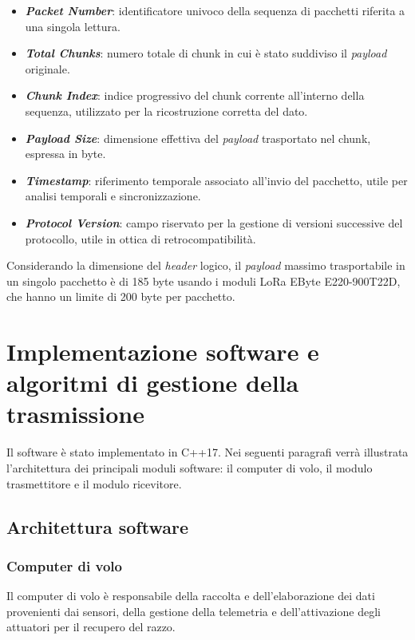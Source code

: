 \documentclass[12pt,a4paper,twoside]{book}
\begin{document}
\begin{itemize}
    \item \textbf{\emph{Packet Number}}: identificatore univoco della sequenza di pacchetti riferita a una singola lettura.
    \item \textbf{\emph{Total Chunks}}: numero totale di chunk in cui è stato suddiviso il \emph{payload} originale.
    \item \textbf{\emph{Chunk Index}}: indice progressivo del chunk corrente all'interno della sequenza, utilizzato per la ricostruzione corretta del dato.
    \item \textbf{\emph{Payload Size}}: dimensione effettiva del \emph{payload} trasportato nel chunk, espressa in byte.
    \item \textbf{\emph{Timestamp}}: riferimento temporale associato all’invio del pacchetto, utile per analisi temporali e sincronizzazione.
    \item \textbf{\emph{Protocol Version}}: campo riservato per la gestione di versioni successive del protocollo, utile in ottica di retrocompatibilità.
\end{itemize}

Considerando la dimensione del \emph{header} logico, il \emph{payload} massimo trasportabile in un singolo pacchetto
è di 185 byte usando i moduli \ac{LoRa} EByte E220-900T22D, che hanno un limite di 200 byte per pacchetto.

\section{Implementazione software e algoritmi di gestione della trasmissione}
Il software è stato implementato in C++17. Nei seguenti paragrafi verrà illustrata
l'architettura dei principali moduli software: il computer di volo,
il modulo trasmettitore e il modulo ricevitore.

\subsection{Architettura software}

\subsubsection{Computer di volo}
Il computer di volo è responsabile della raccolta e dell'elaborazione dei dati
provenienti dai sensori, della gestione della telemetria e dell'attivazione degli
attuatori per il recupero del razzo.
\end{document}
